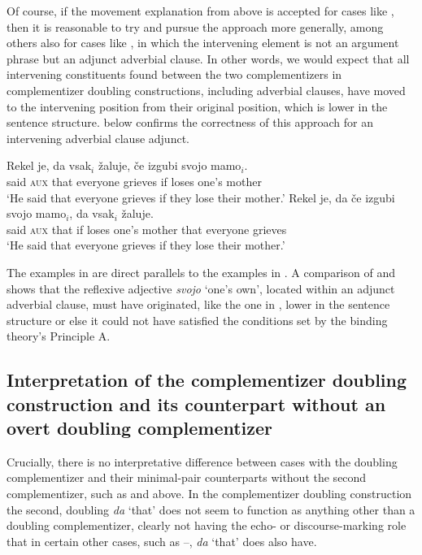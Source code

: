 \documentclass[output=paper,
]{langscibook}
\begin{document}
\noindent Of course, if the movement explanation from above is accepted for cases like , then it is reasonable to try and pursue the approach more generally, among others also for cases like , in which the intervening element is not an argument phrase but an adjunct adverbial clause. In other words, we would expect that all intervening constituents found between the two complementizers in complementizer doubling constructions, including adverbial clauses, have moved to the intervening position from their original position, which is lower in the sentence structure.  below confirms the correctness of this approach for an intervening adverbial clause adjunct. %

\begin{exe}
\ex \begin{xlist} \label{ex:plesnicar:six}
\ex \label{ex:plesnicar:sixa}
\gll Rekel 	je, 	da 	vsak$_i$ 		žaluje, 	če 	izgubi 	svojo 	mamo$_i$.\\
	said 	\textsc{aux}	that	everyone	grieves	if	loses	one’s	mother \\
\trans `He said that everyone grieves if they lose their mother.'
\ex \label{ex:plesnicar:sixb}
\gll	Rekel 	je, 	da 	če 	izgubi 	svojo 	mamo$_i$, da 	vsak$_i$ 		žaluje. 	\\
	said	\textsc{aux}	that	if	loses	one’s	mother	 that	everyone	grieves \\
\trans `He said that everyone grieves if they lose their mother.'
\end{xlist}\end{exe}

\noindent The examples in  are direct parallels to the examples in . A comparison of  and  shows that the reflexive adjective \textit{svojo} `one’s own', located within an adjunct adverbial clause, must have originated, like the one in , lower in the sentence structure or else it could not have satisfied the conditions set by the binding theory’s Principle A. 


\subsection{Interpretation of the complementizer doubling construction and its counterpart without an overt doubling complementizer} \label{s22}

Crucially, there is no interpretative difference between cases with the doubling complementizer and their minimal-pair counterparts without the second complementizer, such as  and  above. In the complementizer doubling construction the second, doubling \textit{da} `that' does not seem to function as anything other than a doubling complementizer, clearly not having the echo- or discourse-marking role that in certain other cases, such as --, \textit{da} `that' does also have. 
\end{document}
